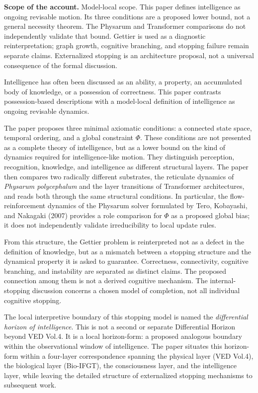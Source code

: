 \noindent\textbf{Scope of the account.} Model-local scope. This paper defines intelligence as ongoing revisable motion. Its three conditions are a proposed lower bound, not a general necessity theorem. The Physarum and Transformer comparisons do not independently validate that bound. Gettier is used as a diagnostic reinterpretation; graph growth, cognitive branching, and stopping failure remain separate claims. Externalized stopping is an architecture proposal, not a universal consequence of the formal discussion.

Intelligence has often been discussed as an ability, a property, an accumulated body of knowledge, or a possession of correctness. This paper contrasts possession-based descriptions with a model-local definition of intelligence as ongoing revisable dynamics.

The paper proposes three minimal axiomatic conditions: a connected state space, temporal ordering, and a global constraint $\Phi$. These conditions are not presented as a complete theory of intelligence, but as a lower bound on the kind of dynamics required for intelligence-like motion. They distinguish perception, recognition, knowledge, and intelligence as different structural layers. The paper then compares two radically different substrates, the reticulate dynamics of \emph{Physarum polycephalum} and the layer transitions of Transformer architectures, and reads both through the same structural conditions. In particular, the flow-reinforcement dynamics of the Physarum solver formulated by Tero, Kobayashi, and Nakagaki (2007) provides a role comparison for $\Phi$ as a proposed global bias; it does not independently validate irreducibility to local update rules.

From this structure, the Gettier problem is reinterpreted not as a defect in the definition of knowledge, but as a mismatch between a stopping structure and the dynamical property it is asked to guarantee. Correctness, connectivity, cognitive branching, and instability are separated as distinct claims. The proposed connection among them is not a derived cognitive mechanism. The internal-stopping discussion concerns a chosen model of completion, not all individual cognitive stopping.

The local interpretive boundary of this stopping model is named the \emph{differential horizon of intelligence}. This is not a second or separate Differential Horizon beyond VED Vol.4. It is a local horizon-form: a proposed analogous boundary within the observational window of intelligence. The paper situates this horizon-form within a four-layer correspondence spanning the physical layer (VED Vol.4), the biological layer (Bio-IFGT), the consciousness layer, and the intelligence layer, while leaving the detailed structure of externalized stopping mechanisms to subsequent work.
